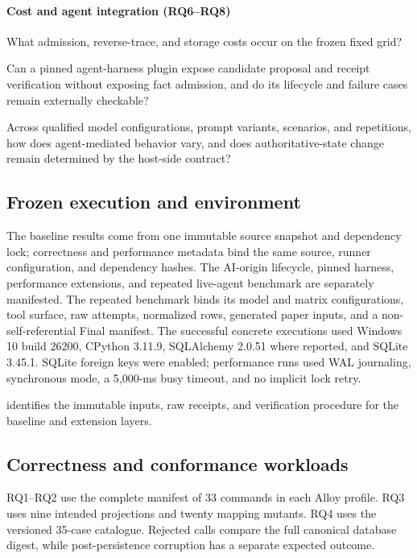\paragraph{Cost and agent integration (RQ6--RQ8)}
\begin{description}[leftmargin=2.6em,labelwidth=2.1em,style=nextline]
  \item[RQ6] What admission, reverse-trace, and storage costs occur on the frozen fixed grid?
  \item[RQ7] Can a pinned agent-harness plugin expose candidate proposal and receipt verification without exposing fact admission, and do its lifecycle and failure cases remain externally checkable?
  \item[RQ8] Across qualified model configurations, prompt variants, scenarios, and repetitions, how does agent-mediated behavior vary, and does authoritative-state change remain determined by the host-side contract?
\end{description}

\subsection{Frozen execution and environment}

The baseline results come from one immutable source snapshot and dependency lock; correctness and performance metadata bind the same source, runner configuration, and dependency hashes. The AI-origin lifecycle, pinned harness, performance extensions, and repeated live-agent benchmark are separately manifested. The repeated benchmark binds its model and matrix configurations, tool surface, raw attempts, normalized rows, generated paper inputs, and a non-self-referential Final manifest. The successful concrete executions used Windows 10 build 26200, CPython 3.11.9, SQLAlchemy 2.0.51 where reported, and SQLite 3.45.1. SQLite foreign keys were enabled; performance runs used WAL journaling,  synchronous mode, a 5,000-ms busy timeout, and no implicit lock retry.

 identifies the immutable inputs, raw receipts, and verification procedure for the baseline and extension layers.

\subsection{Correctness and conformance workloads}

RQ1--RQ2 use the complete manifest of 33 commands in each Alloy profile. RQ3 uses nine intended projections and twenty mapping mutants. RQ4 uses the versioned 35-case catalogue. Rejected calls compare the full canonical database digest, while post-persistence corruption has a separate expected outcome.

